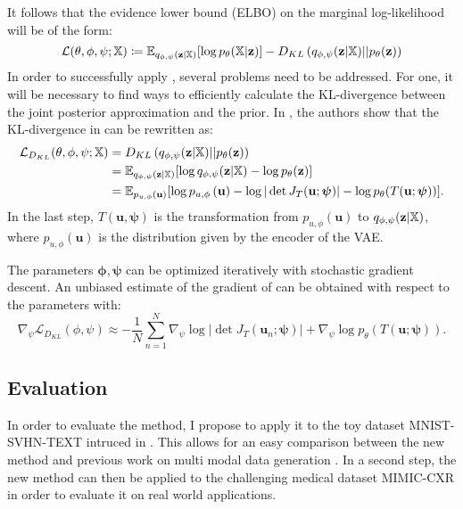 \documentclass[english]{scrartcl}
\begin{document}
    It follows that the evidence lower bound (ELBO) on the marginal log-likelihood will be of the form:
    \begin{equation}
        \label{eq:elbo}
        \mathcal{L}(\theta, \phi, \psi; \mathbb{X}) \coloneqq \mathbb{E}_{q_{\phi, \psi}(\textbf{z}|\mathbb{X})}[\log p_{\theta}(\mathbb{X}|\textbf{z})] - D_{KL} \left( q_{\phi, \psi}(\textbf{z}|\mathbb{X}) ||p_{\theta}(\textbf{z})\right)
    \end{equation}
    In order to successfully apply , several problems need to be addressed.
    For one, it will be necessary to find ways to efficiently calculate the KL-divergence between the joint posterior approximation and the prior.
    In \citet{papamakarios_normalizing_2019}, the authors show that the KL-divergence in  can be rewritten as:
    \begin{equation}
        \label{eq:Dkl}
        \begin{split}
            \mathcal{L}_{D_{KL}}(\theta, \phi, \psi; \mathbb{X}) & =D_{KL} \left( q_{\phi, \psi}(\textbf{z}|\mathbb{X}) || p_{\theta}(\textbf{z}) \right)\\
            & = \mathbb{E}_{q_{\phi, \psi}(\textbf{z}|\mathbb{X})}[\log q_{\phi, \psi}(\textbf{z}|\mathbb{X}) - \log p_{\theta}(\textbf{z})]\\
            & = \mathbb{E}_{p_{u,\phi}(\textbf{u})}[\log p_{u,\phi} \left(\textbf{u} \right) - \log |\det J_{T}(\textbf{u}; \boldsymbol{\psi})|- \log p_{\theta}(T(\textbf{u}; \boldsymbol{\psi}))].
        \end{split}
    \end{equation}
    In the last step, $T(\textbf{u},\boldsymbol{\psi})$ is the transformation from $p_{u,\phi}(\textbf{u})$ to $q_{\phi, \psi}(\textbf{z}|\mathbb{X})$, where $p_{u,\phi}(\textbf{u})$ is the distribution given by the encoder of the VAE.

    The parameters $\boldsymbol{\phi}, \boldsymbol{\psi}$ can be optimized iteratively with stochastic gradient descent.
    An unbiased estimate of the gradient of  can be obtained with respect to the parameters with:
    \begin{equation}
        \nabla _{\psi} \mathcal{L}_{D_{KL}}(\phi, \psi) \approx - \frac{1}{N} \sum ^N _{n=1}   \nabla _{\psi}\log |\det J_{T}(\textbf{u}_n; \boldsymbol{\psi})| + \nabla _{\psi} \log p_{\theta}(T(\textbf{u}; \boldsymbol{\psi})).
    \end{equation}


    \subsection{Evaluation}
    In order to evaluate the method, I propose to apply it to the toy dataset MNIST-SVHN-TEXT intruced in \citet{shi_variational_2019}.
    This allows for an easy comparison between the new method and previous work on multi modal data generation \citep[MoPoE, MoE, PoE][]{sutter_generalized_2020, shi_variational_2019, wu_multimodal_2018}.
    In a second step, the new method can then be applied to the challenging medical dataset MIMIC-CXR \citep{johnson_mimic-cxr-jpg_2019} in order to evaluate it on real world applications.
\end{document}
